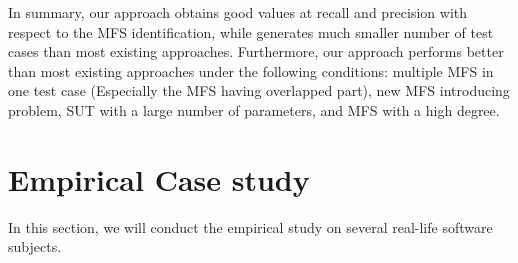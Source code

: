 \documentclass{sig-alternate-05-2015}
\begin{document}
{{{{In summary, our approach obtains good values at recall and precision with respect to the MFS identification, while generates much smaller number of test cases than most existing approaches. Furthermore, our approach performs better than most existing approaches under the following conditions: multiple MFS in one test case (Especially the MFS having overlapped part), new  MFS introducing problem, SUT with a large number of parameters, and MFS with a high degree.


\section{Empirical Case study}\label{sec:realEx}
In this section, we will conduct the empirical study on several real-life software subjects.



%
%





}}}}
\end{document}
